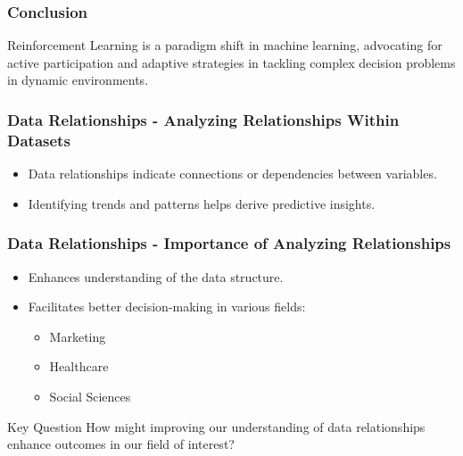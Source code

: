 \documentclass[aspectratio=169]{beamer}
\begin{document}
\begin{frame}[fragile]
    \frametitle{Conclusion}
    Reinforcement Learning is a paradigm shift in machine learning, advocating for active participation and adaptive strategies in tackling complex decision problems in dynamic environments.
\end{frame}

\begin{frame}[fragile]
  \frametitle{Data Relationships - Analyzing Relationships Within Datasets}
  
  \begin{itemize}
    \item Data relationships indicate connections or dependencies between variables.
    \item Identifying trends and patterns helps derive predictive insights.
  \end{itemize}
  
\end{frame}

\begin{frame}[fragile]
  \frametitle{Data Relationships - Importance of Analyzing Relationships}

  \begin{itemize}
    \item Enhances understanding of the data structure.
    \item Facilitates better decision-making in various fields:
    \begin{itemize}
      \item Marketing
      \item Healthcare
      \item Social Sciences
    \end{itemize}
  \end{itemize}

  \begin{block}{Key Question}
    How might improving our understanding of data relationships enhance outcomes in our field of interest?
  \end{block}
  
\end{frame}
\end{document}
